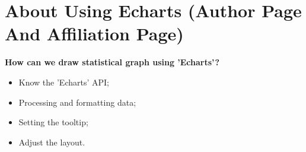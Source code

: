 \documentclass{article}
\begin{document}
	\begin{figure}[!h]
	\end{figure}
	\section{About Using Echarts (Author Page And Affiliation Page)}
	\textbf{How can we draw statistical graph using 'Echarts'?}\\
	\begin{itemize}
		\item Know the 'Echarts' API;
		\item Processing and formatting data;
		\item Setting the tooltip;
		\item Adjust the layout.
	\end{itemize}
	
\end{document}
